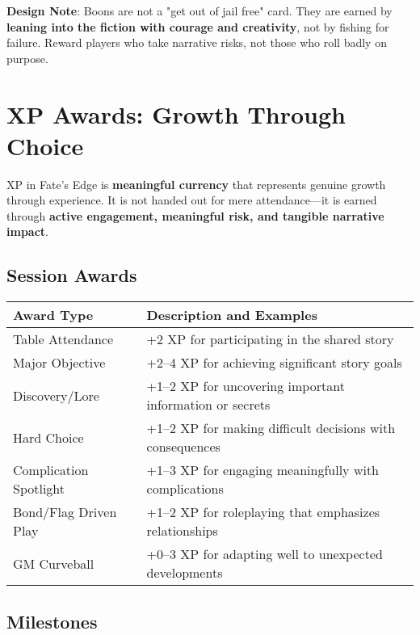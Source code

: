 \textbf{Design Note}: Boons are not a "get out of jail free" card. They are earned by \textbf{leaning into the fiction with courage and creativity}, not by fishing for failure. Reward players who take narrative risks, not those who roll badly on purpose.

\section*{XP Awards: Growth Through Choice}

XP in Fate's Edge is \textbf{meaningful currency} that represents genuine growth through experience. It is not handed out for mere attendance---it is earned through \textbf{active engagement, meaningful risk, and tangible narrative impact}.

\subsection*{Session Awards}

\begin{fatebox}
\begin{tabularx}{\textwidth}{lX}
\toprule
\textbf{Award Type} & \textbf{Description and Examples} \\
\midrule
Table Attendance & +2 XP for participating in the shared story \\
Major Objective & +2--4 XP for achieving significant story goals \\
Discovery/Lore & +1--2 XP for uncovering important information or secrets \\
Hard Choice & +1--2 XP for making difficult decisions with consequences \\
Complication Spotlight & +1--3 XP for engaging meaningfully with complications \\
Bond/Flag Driven Play & +1--2 XP for roleplaying that emphasizes relationships \\
GM Curveball & +0--3 XP for adapting well to unexpected developments \\
\bottomrule
\end{tabularx}
\end{fatebox}

\subsection*{Milestones}


